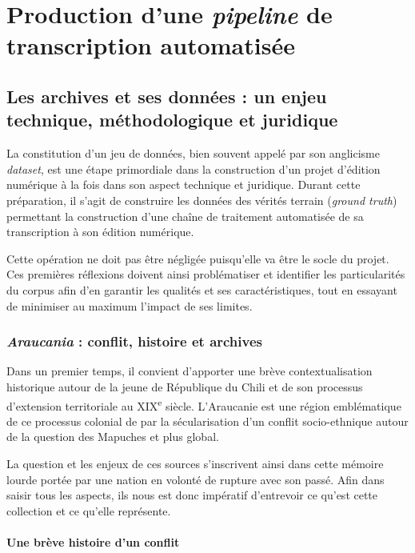 \part{Production d'une \textit{pipeline} de transcription automatisée}

	\chapter{Les archives et ses données : un enjeu technique, méthodologique et juridique}
	
    La constitution d'un jeu de données, bien souvent appelé par son anglicisme \textit{dataset}, est une étape primordiale dans la construction d’un projet d’édition numérique à la fois dans son aspect technique et juridique. Durant cette préparation, il s’agit de construire les données des vérités terrain (\textit{ground truth}) permettant la construction d’une chaîne de traitement automatisée de sa transcription à son édition numérique.
    
    Cette opération ne doit pas être négligée puisqu'elle va être le socle du projet. Ces premières réflexions doivent ainsi problématiser et identifier les particularités du corpus afin d'en garantir les qualités et ses caractéristiques, tout en essayant de minimiser au maximum l'impact de ses limites.
	
	\section{\textit{Araucania} : conflit, histoire et archives}
	
	Dans un premier temps, il convient d'apporter une brève contextualisation historique autour de la jeune de République du Chili et de son processus d'extension territoriale au XIX\textsuperscript{e} siècle.  L'Araucanie est une région emblématique de ce processus colonial de par la sécularisation d'un conflit socio-ethnique autour de la question des Mapuches et plus global.
	
	La question et les enjeux de ces sources s'inscrivent ainsi dans cette mémoire lourde portée par une nation en volonté de rupture avec son passé. Afin dans saisir tous les aspects, ils nous est donc impératif d'entrevoir ce qu'est cette collection et ce qu'elle représente.
	
	\subsection{Une brève histoire d'un conflit}
	
